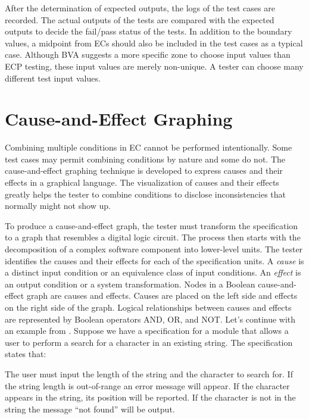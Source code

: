 After the determination of expected outputs, the logs of the test cases are recorded. The actual outputs of the tests are compared with the expected outputs to decide the fail/pass status of the tests. In addition to the boundary values, a midpoint from ECs should also be included in the test cases as a typical case. Although BVA suggests a more specific zone to choose input values than ECP testing, these input values are merely non-unique. A tester can choose many different test input values.

\section{Cause-and-Effect Graphing}
Combining multiple conditions in EC cannot be performed intentionally. Some test cases may permit combining conditions by nature and some do not. The cause-and-effect graphing technique is developed to express causes and their effects in a graphical language. The visualization of causes and their effects greatly helps the tester to combine conditions to disclose inconsistencies that normally might not show up.

To produce a cause-and-effect graph, the tester must transform the specification to a graph that resembles a digital logic circuit. The process then starts with the decomposition of a complex software component into lower-level units. The tester identifies the causes and their effects for each of the specification units. A \emph{cause} is a distinct input condition or an equivalence class of input conditions. An \emph{effect} is an output condition or a system transformation. Nodes in a Boolean cause-and-effect graph are causes and effects. Causes are placed on the left side and effects on the right side of the graph. Logical relationships between causes and effects are represented by Boolean operators AND, OR, and NOT. Let's continue with an example from \autocite{burnstein2006practical}. Suppose we have a specification for a module that allows a user to perform a search for a character in an existing string. The specification states that:

\begin{displayquote}
    The user must input the length of the string and the character to search for. If the string length is out-of-range an error message will appear. If the character appears in the string, its position will be reported. If the character is not in the string the message “not found” will be output.
\end{displayquote}


